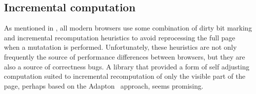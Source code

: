 \subsection{Incremental computation} As mentioned in ,
all modern browsers use some combination of dirty bit marking and incremental
recomputation heuristics to avoid reprocessing the full page when
a mutatation is performed.
Unfortunately, these heuristics are not only frequently the source of
performance differences between browsers, but they are also a source of
correctness bugs.
A library that provided a form of self adjusting computation suited to
incremental recomputation of only the visible part of the page, perhaps
based on the Adapton~\cite{adapton} approach, seems promising.

